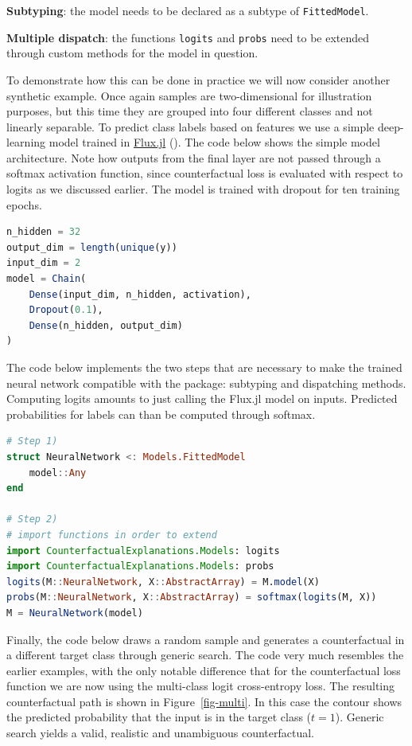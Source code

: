 \documentclass[
  letterpaper,
  DIV=11,
  numbers=noendperiod]{scrartcl}
\begin{document}
\begin{unnumlist}
\item \textbf{Subtyping}: the model needs to be declared as a subtype of \texttt{FittedModel}.
\item \textbf{Multiple dispatch}: the functions \texttt{logits} and \texttt{probs} need to be extended through custom methods for the model in question.
\end{unnumlist}

To demonstrate how this can be done in practice we will now consider
another synthetic example. Once again samples are two-dimensional for
illustration purposes, but this time they are grouped into four
different classes and not linearly separable. To predict class labels
based on features we use a simple deep-learning model trained in
\href{https://fluxml.ai/}{Flux.jl} (\cite{innes2018flux}). The code
below shows the simple model architecture. Note how outputs from the
final layer are not passed through a softmax activation function, since
counterfactual loss is evaluated with respect to logits as we discussed
earlier. The model is trained with dropout for ten training epochs.

\begin{lstlisting}[language = Julia]
n_hidden = 32
output_dim = length(unique(y))
input_dim = 2
model = Chain(
    Dense(input_dim, n_hidden, activation),
    Dropout(0.1),
    Dense(n_hidden, output_dim)
)  
\end{lstlisting}

The code below implements the two steps that are necessary to make the
trained neural network compatible with the package: subtyping and
dispatching methods. Computing logits amounts to just calling the
Flux.jl model on inputs. Predicted probabilities for labels can than be
computed through softmax.

\begin{lstlisting}[language = Julia]
# Step 1)
struct NeuralNetwork <: Models.FittedModel
    model::Any
end

# Step 2)
# import functions in order to extend
import CounterfactualExplanations.Models: logits
import CounterfactualExplanations.Models: probs 
logits(M::NeuralNetwork, X::AbstractArray) = M.model(X)
probs(M::NeuralNetwork, X::AbstractArray) = softmax(logits(M, X))
M = NeuralNetwork(model)
\end{lstlisting}

Finally, the code below draws a random sample and generates a
counterfactual in a different target class through generic search. The
code very much resembles the earlier examples, with the only notable
difference that for the counterfactual loss function we are now using
the multi-class logit cross-entropy loss. The resulting counterfactual
path is shown in Figure~\ref{fig-multi}. In this case the contour shows
the predicted probability that the input is in the target class
(\(t=1\)). Generic search yields a valid, realistic and unambiguous
counterfactual.
\end{document}
